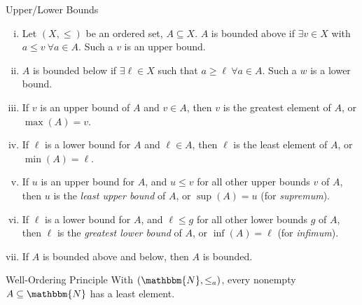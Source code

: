 \documentclass[10pt]{extarticle}
\newcommand{\N}{\mathbbm{N}}
\begin{document}
  \begin{problem}{Upper/Lower Bounds}
    \begin{enumerate}[(i)]
      \item Let $(X,\leq)$ be an ordered set, $A\subseteq X$. $A$ is bounded above if $\exists v\in X$ with $a\leq v~\forall a\in A$. Such a $v$ is an upper bound.
      \item $A$ is bounded below if $\exists \ell\in X$ such that $a\geq \ell~\forall a\in A$. Such a $w$ is a lower bound.
      \item If $v$ is an upper bound of $A$ and $v\in A$, then $v$ is the greatest element of $A$, or $\max(A) = v$.
      \item If $\ell$ is a lower bound for $A$ and $\ell\in A$, then $\ell$ is the least element of $A$, or $\min(A) = \ell$.
      \item If $u$ is an upper bound for $A$, and $u \leq v$ for all other upper bounds $v$ of $A$, then $u$ is the \textsl{least upper bound} of $A$, or $\sup(A) = u$ (for \textit{supremum}).
      \item If $\ell$ is a lower bound for $A$, and $\ell \leq g$ for all other lower bounds $g$ of $A$, then $\ell$ is the \textsl{greatest lower bound} of $A$, or $\inf(A) = \ell$ (for \textit{infimum}).
      \item If $A$ is bounded above and below, then $A$ is bounded.
    \end{enumerate}
  \end{problem}
  \begin{problem}{Well-Ordering Principle}
    With $(\N,\leq_a)$, every nonempty $A\subseteq \N$ has a least element.
  \end{problem}
\end{document}
